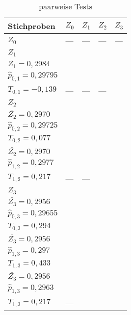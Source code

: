 \begin{table}[h!]
\centering
\begin{tabular}{l | l | l | l | l }
Stichproben & $Z_{0}$ & $Z_{1}$ & $Z_{2}$ & $Z_{3}$
\\ \hline
$Z_{0}$ 
& --- 
& --- 
& --- 
& --- \\ \hline

$Z_{1}$ 
& 
\makecell[l]{
$\bar{Z_0} = 0,2975$ \\
$\bar{Z_1} = 0,2984$ \\
$\hat{p}_{0,1} = 0,29795$ \\
$T_{0,1} = -0,139$ } 
& --- 
& --- 
& --- \\ \hline

$Z_{2}$ 
&
\makecell[l]{
$\bar{Z_0} = 0,2975$ \\
$\bar{Z_2} = 0,2970$ \\
$\hat{p}_{0,2} = 0,29725$ \\
$T_{0,2} = 0,077$ } 
&
\makecell[l]{
$\bar{Z_1} = 0,2975$ \\
$\bar{Z_2} = 0,2970$ \\
$\hat{p}_{1,2} = 0,2977$ \\
$T_{1,2} = 0,217$ } 
& --- 
& --- \\ \hline

$Z_{3}$ 
& 
\makecell[l]{
$\bar{Z_0} = 0,2975$ \\
$\bar{Z_3} = 0,2956$ \\
$\hat{p}_{0,3} = 0,29655$ \\
$T_{0,3} = 0,294$ } 
&
\makecell[l]{
$\bar{Z_1} = 0,2975$ \\
$\bar{Z_3} = 0,2956$ \\
$\hat{p}_{1,3} = 0,297$ \\
$T_{1,3} = 0,433$ } 
&
\makecell[l]{
$\bar{Z_2} = 0,2970$ \\
$\bar{Z_3} = 0,2956$ \\
$\hat{p}_{1,3} = 0,2963$ \\
$T_{1,3} = 0,217$ } 
& --- \\
\end{tabular}
	\caption{paarweise Tests}
	\label{asm_ccr}
\end{table}
